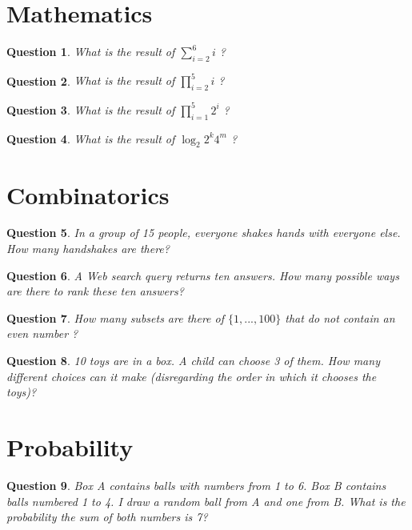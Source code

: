 \documentclass[13pt,a4paper]{article}
\newtheorem{question}{Question}
\begin{document}
\section{Mathematics}

\begin{question}
What is  the result of $\sum_{i=2}^{6} i$ ? 
\end{question}


\begin{question}
What is  the result of $\prod_{i=2}^{5} i$ ? 
\end{question}

\begin{question}
What is  the result of  $\prod_{i=1}^5 2^i$  ? 
\end{question}



\begin{question}
What is  the result of  $\log_2 2^k 4^m$  ? 
\end{question}

\section{Combinatorics}

\begin{question}
In a group of 15 people, everyone shakes hands with everyone else.  How many handshakes are there? 
\end{question}

\begin{question}
A Web search query returns ten answers. How many possible ways are there to rank these ten answers?
\end{question}

\begin{question}
How many subsets are there of $\{1, ... , 100\}$ that do not contain an even number ? 
\end{question}

\begin{question}
10 toys are in a box.  A child can choose 3 of them.  How many different choices can it make (disregarding the order in which it chooses the toys)?  
\end{question}

\section{Probability}
\begin{question}
Box A contains balls with numbers from 1 to 6.  Box B contains balls numbered 1 to 4.   I draw a random ball from A and one from B.  What is the probability the sum of both numbers is 7?
\end{question}
\end{document}
